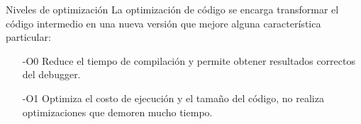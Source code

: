 \documentclass[aspectratio=169]{beamer}
\begin{document}
\begin{frame}[fragile,t]{Niveles de optimización}
La optimización de código se encarga transformar el código intermedio en una nueva versión que mejore alguna característica particular:
\vspace{0.2cm}
\begin{itemize}
\setlength\itemsep{0.5cm}
\item[-O0] Reduce el tiempo de compilación y permite obtener resultados correctos del debugger.
\item[-O1] Optimiza el costo de ejecución y el tamaño del código, no realiza optimizaciones que demoren mucho tiempo.

\end{itemize}
\end{frame}
\end{document}
